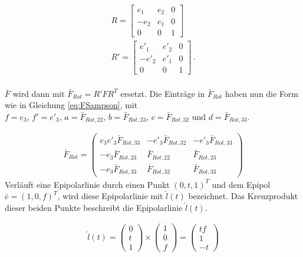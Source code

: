 \begin{gather}
	R = \begin{bmatrix}
		e_1&e_2&0\\
		-e_2&e_1&0\\
		0&0&1
	\end{bmatrix}\\
	R' = \begin{bmatrix}
	e'_1&e'_2&0\\
	-e'_2&e'_1&0\\
	0&0&1
\end{bmatrix}\, .
\end{gather}\\

$\bar{F}$ wird dann mit $\bar{F}_{Rot} = R'FR^T$ ersetzt. Die Einträge in $\bar{F}_{Rot}$ haben nun die Form wie in Gleichung \ref{eq:FSampson}, mit $f = e_3, \, f' = e'_3, \, a = \bar{F}_{Rot,22}, \, b = \bar{F}_{Rot,23}, \, c = \bar{F}_{Rot,32}$ und $d = \bar{F}_{Rot,33}$.

\begin{gather}
	\bar{F}_{Rot} = 
\begin{pmatrix}
	e_3e'_3 \bar{F}_{Rot,33}&-e'_3 \bar{F}_{Rot,32}&-e'_3\bar{F}_{Rot,33}\\
	-e_3 \bar{F}_{Rot,23} & \bar{F}_{Rot,22} &\bar{F}_{Rot,23}\\
	-e_3 \bar{F}_{Rot,33}& \bar{F}_{Rot,32} &\bar{F}_{Rot,33} \label{eq:SampsonFRot}
\end{pmatrix}
\end{gather}
Verläuft eine Epipolarlinie durch einen Punkt $(0,t,1)^T$ und dem Epipol $\bar{e} = (1,0,f)^T$, wird diese Epipolarlinie mit $\hat{l}(t)$ bezeichnet. Das Kreuzprodukt dieser beiden Punkte beschreibt die Epipolarlinie $\hat{l}(t)$\cite{HZ}. %

\begin{gather}
\hat{l}(t)=
	\begin{pmatrix}
	0\\t\\1
	\end{pmatrix} \times
	\begin{pmatrix}
	1\\0\\f
	\end{pmatrix} = 
	\begin{pmatrix}
	tf\\1\\-t
	\end{pmatrix}
\end{gather}

